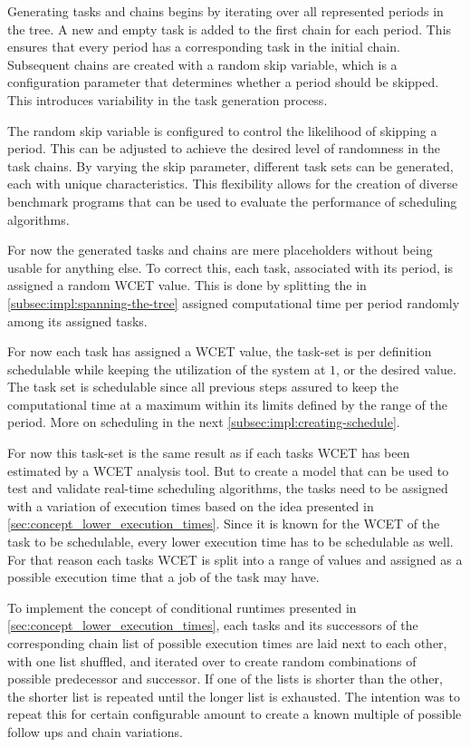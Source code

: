 Generating tasks and chains begins by iterating over all represented periods in the tree.
A new and empty task is added to the first chain for each period.
This ensures that every period has a corresponding task in the initial chain.
Subsequent chains are created with a random skip variable, which is a configuration parameter that determines whether a period should be skipped.
This introduces variability in the task generation process.

The random skip variable is configured to control the likelihood of skipping a period.
This can be adjusted to achieve the desired level of randomness in the task chains.
By varying the skip parameter, different task sets can be generated, each with unique characteristics.
This flexibility allows for the creation of diverse benchmark programs that can be used to evaluate the performance of scheduling algorithms.

For now the generated tasks and chains are mere placeholders without being usable for anything else.
To correct this, each task, associated with its period, is assigned a random \ac{WCET} value.
This is done by splitting the in \cref{subsec:impl:spanning-the-tree} assigned computational time per period randomly among its assigned tasks.

For now each task has assigned a \ac{WCET} value, the task-set is per definition schedulable while keeping the utilization of the system at $1$, or the desired value.
The task set is schedulable since all previous steps assured to keep the computational time at a maximum within its limits defined by the range of the period.
More on scheduling in the next \cref{subsec:impl:creating-schedule}.

For now this task-set is the same result as if each tasks \ac{WCET} has been estimated by a \ac{WCET} analysis tool.
But to create a model that can be used to test and validate real-time scheduling algorithms, the tasks need to be assigned with a variation of execution times based on the idea presented in \cref{sec:concept_lower_execution_times}.
Since it is known for the \ac{WCET} of the task to be schedulable, every lower execution time has to be schedulable as well.
For that reason each tasks \ac{WCET} is split into a range of values and assigned as a possible execution time that a job of the task may have.

To implement the concept of conditional runtimes presented in \cref{sec:concept_lower_execution_times}, each tasks and its successors of the corresponding chain list of possible execution times are laid next to each other, with one list shuffled, and iterated over to create random combinations of possible predecessor and successor.
If one of the lists is shorter than the other, the shorter list is repeated until the longer list is exhausted.
The intention was to repeat this for certain configurable amount to create a known multiple of possible follow ups and chain variations.

